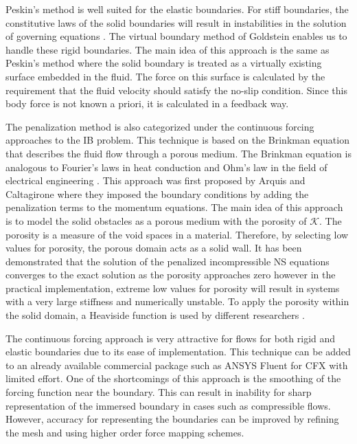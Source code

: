 Peskin's method is well suited for the elastic boundaries. For stiff boundaries, the constitutive laws of the solid boundaries will result in instabilities in the solution of governing equations \cite{mittal2005immersed}. The virtual boundary method of Goldstein \cite{goldstein1993modeling} enables us to handle these rigid boundaries. The main idea of this approach is the same as Peskin's method where the solid boundary is treated as a virtually existing surface embedded in the fluid. The force on this surface is calculated by the requirement that the fluid velocity should satisfy the no-slip condition. Since this body force is not known a priori, it is calculated in a feedback way.

The penalization method is also categorized under the continuous forcing approaches to the IB problem. This technique is based on the Brinkman equation that describes the fluid flow through a porous medium. The Brinkman equation is analogous to Fourier's laws in heat conduction and Ohm's law in the field of electrical engineering \cite{durlofsky1987analysis}. This approach was first proposed by Arquis and Caltagirone \cite{arquis1984conditions} where they imposed the boundary conditions by adding the penalization terms to the momentum equations. The main idea of this approach is to model the solid obstacles as a porous medium with the porosity of $\mathcal{K}$. The porosity is a measure of the void spaces in a material. Therefore, by selecting low values for porosity, the porous domain acts as a solid wall. It has been demonstrated that the solution of the penalized incompressible NS equations converges to the exact solution as the porosity approaches zero \cite{angot1999analysis} however in the practical implementation, extreme low values for porosity will result in systems with a very large stiffness and numerically unstable. To apply the porosity within the solid domain, a Heaviside function is used by different researchers \cite{gazzola2011simulations, kevlahan2001computation}.

The continuous forcing approach is very attractive for flows for both rigid and elastic boundaries due to its ease of implementation. This technique can be added to an already available commercial package such as ANSYS Fluent for CFX with limited effort. One of the shortcomings of this approach is the smoothing of the forcing function near the boundary. This can result in inability for sharp representation of the immersed boundary in cases such as compressible flows. However, accuracy for representing the boundaries can be improved by refining the mesh and using higher order force mapping schemes.

